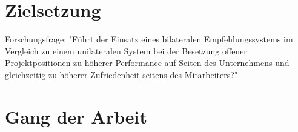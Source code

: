 \section{Zielsetzung}
\label{sec:intro:zielsetzung}
Forschungsfrage: "Führt der Einsatz eines bilateralen Empfehlungssystems im Vergleich zu einem unilateralen System bei der Besetzung offener Projektpositionen zu höherer Performance auf Seiten des Unternehmens und gleichzeitig zu höherer Zufriedenheit seitens des Mitarbeiters?"

\section{Gang der Arbeit}
\label{sec:intro:gangDerArbeit}

